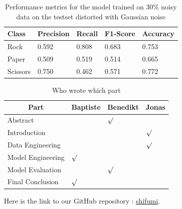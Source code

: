 \documentclass[a4paper]{article}
\begin{document}
\begin{table}[H]
	\centering
	\caption{Performance metrics for the model trained on 30\% noisy data on the testset distorted with Gaussian noise}
	\label{tbl:noisy_model_Gauss}
	\begin{tabular}{@{}lllll@{}}
		\toprule
		Class    & Precision & Recall & F1-Score & Accuracy \\ \midrule
		Rock     & 0.592     & 0.808  & 0.683    & 0.753    \\
		Paper    & 0.509     & 0.519  & 0.514    & 0.665    \\
		Scissors & 0.750     & 0.462  & 0.571    & 0.772    \\ \bottomrule
	\end{tabular}
\end{table}

\begin{table}[H]
\caption{Who wrote which part}
\label{tbl:who}
\centering
\begin{tabular}{@{}llll@{}}
\toprule
\multicolumn{1}{c}{Part} & Baptiste   & Benedikt  & Jonas  \\ \midrule
Abstract                     			& & $\surd$  & \\
Introduction                 			&   &  & $\surd$ \\
Data Engineering             			&   &  & $\surd$ \\
Model Engineering 						& $\surd$ & & \\ 
Model Evaluation 						& & $\surd$  & \\
Final Conclusion						& $\surd$ & & \\ 
\bottomrule
\end{tabular}
\end{table}



Here is the link to our GitHub repository : \href{https://github.com/bptstbn/shifumi/tree/ja_final_report}{shifumi}.
\end{document}
